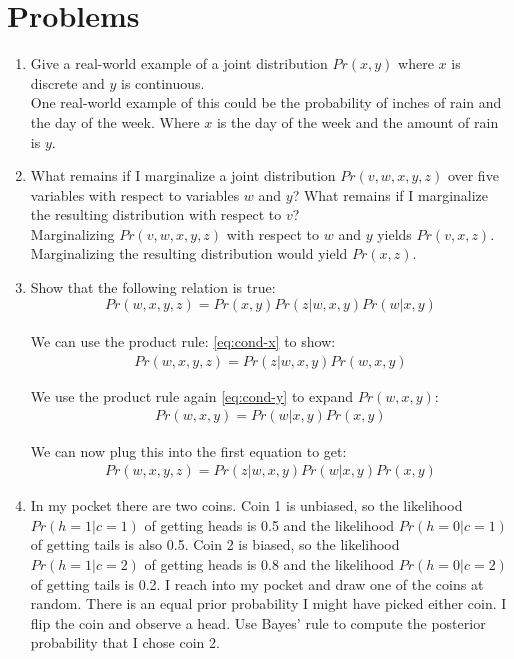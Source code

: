 \documentclass{article}
\begin{document}
\section{Problems}

\begin{enumerate}
\item Give a real-world example of a joint distribution $Pr(x, y)$ where $x$ is discrete and $y$ is continuous. \\

One real-world example of this could be the probability of inches of rain and the day of the week. Where $x$ is the day of the week and the amount of rain is $y$.
\\
\item What remains if I marginalize a joint distribution $Pr(v, w, x, y, z)$ over five variables with respect to variables $w$ and $y$? What remains if I marginalize the resulting distribution with respect to $v$? \\

Marginalizing $Pr(v, w, x, y, z)$ with respect to $w$ and $y$ yields $Pr(v, x, z)$. Marginalizing the resulting distribution would yield $Pr(x, z)$.
\\
\item Show that the following relation is true:
\begin{equation*}
	Pr\left( w,x,y,z \right) = Pr\left( x,y \right) Pr\left( z|w,x,y \right) Pr\left( w|x,y \right) 
\end{equation*}
\\
We can use the product rule: \ref{eq:cond-x} to show:
\begin{align*}
	Pr\left( w,x,y,z \right) = Pr(z|w,x,y)Pr\left( w,x,y \right) 
\end{align*}

We use the product rule again \ref{eq:cond-y} to expand $Pr(w,x,y)$:
\begin{align*}
	 Pr\left( w,x,y \right) = Pr\left( w|x,y \right) Pr\left( x,y \right) 
\end{align*}

We can now plug this into the first equation to get:
\begin{align*}
	Pr\left( w,x,y,z \right) = Pr\left( z|w,x,y \right) Pr\left( w|x,y \right) Pr(x,y)	
\end{align*}

\item In my pocket there are two coins. Coin 1 is unbiased, so the likelihood $Pr(h = 1|c = 1)$ of getting heads is 0.5 and the likelihood $Pr(h = 0|c = 1)$ of getting tails is also 0.5. Coin 2 is biased, so the likelihood $Pr(h = 1|c = 2)$ of getting heads is 0.8 and the likelihood $Pr(h=0|c=2)$ of getting tails is 0.2. I reach into my pocket and draw one of the coins at random. There is an equal prior probability I might have picked either coin. I flip the coin and observe a head. Use Bayes’ rule to compute the posterior probability that I chose coin 2. \\


\end{enumerate}
\end{document}
